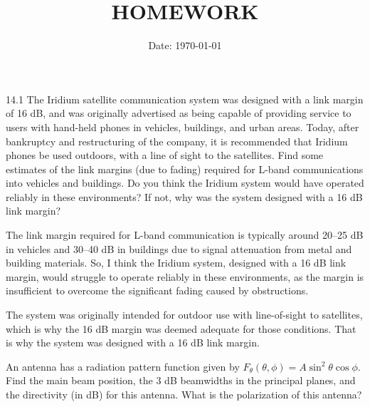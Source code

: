 \documentclass[cn,12pt]{homework}
\title{HOMEWORK} %
\date{Date: \today} %
\institute{ZHEJIANG UNIVERSITY\quad COLLEGE OF INFORMATION SCIENCE AND ELECTRONICS ENGINEERING} %
\begin{document}
\maketitle




14.1 The Iridium satellite communication system was designed with a link margin of 16 dB, and was originally advertised as being capable of providing service to users with hand-held phones in vehicles,
buildings, and urban areas. Today, after bankruptcy and restructuring of the company, it is recommended that Iridium phones be used outdoors, with a line of sight to the satellites. Find some
estimates of the link margins (due to fading) required for L-band communications into vehicles and
buildings. Do you think the Iridium system would have operated reliably in these environments? If
not, why was the system designed with a 16 dB link margin?




\begin{solution}
The link margin required for L-band communication is typically around 20–25 dB in vehicles and 30–40 dB in buildings due to signal attenuation from metal and building materials. 
So, I think the Iridium system, designed with a 16 dB link margin, would struggle to operate 
reliably in these environments, as the margin is insufficient 
to overcome the significant fading caused by obstructions. 

The system was originally intended for outdoor use with line-of-sight to satellites, 
which is why the 16 dB margin was deemed adequate for those conditions.
That is why the system was designed with a 16 dB link margin.

\end{solution}

 An antenna has a radiation pattern function given by \( F_\theta(\theta, \phi) = A \sin^2 \theta \cos \phi \). Find the main beam
position, the 3 dB beamwidths in the principal planes, and the directivity (in dB) for this antenna.
What is the polarization of this antenna?
\end{document}
